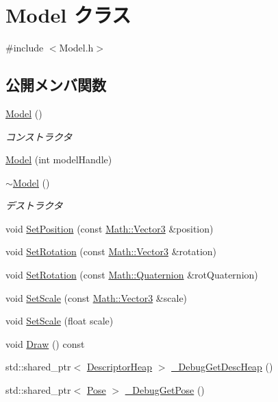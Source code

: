 \hypertarget{class_model}{}\section{Model クラス}
\label{class_model}


{\ttfamily \#include $<$Model.\+h$>$}

\subsection*{公開メンバ関数}
\begin{DoxyCompactItemize}
\item 
\mbox{\hyperlink{class_model_ae3b375de5f6df4faf74a95d64748e048}{Model}} ()
\begin{DoxyCompactList}\small\item\em コンストラクタ \end{DoxyCompactList}\item 
\mbox{\hyperlink{class_model_afce3f8d94c9a80c814df5546346f6efb}{Model}} (int model\+Handle)
\item 
\mbox{\hyperlink{class_model_ad6ebd2062a0b823db841a0b88baac4c0}{$\sim$\+Model}} ()
\begin{DoxyCompactList}\small\item\em デストラクタ \end{DoxyCompactList}\item 
void \mbox{\hyperlink{class_model_abe96911d27ec826d3267dce06998d11f}{Set\+Position}} (const \mbox{\hyperlink{struct_math_1_1_vector3}{Math\+::\+Vector3}} \&position)
\item 
void \mbox{\hyperlink{class_model_abaea345ca45636f8e4f557499e48cfdf}{Set\+Rotation}} (const \mbox{\hyperlink{struct_math_1_1_vector3}{Math\+::\+Vector3}} \&rotation)
\item 
void \mbox{\hyperlink{class_model_a512b73ff13cabdf1264d52a7a65b4481}{Set\+Rotation}} (const \mbox{\hyperlink{struct_math_1_1_quaternion}{Math\+::\+Quaternion}} \&rot\+Quaternion)
\item 
void \mbox{\hyperlink{class_model_aeffe10c8cb6db69220bb5f1b588935e4}{Set\+Scale}} (const \mbox{\hyperlink{struct_math_1_1_vector3}{Math\+::\+Vector3}} \&scale)
\item 
void \mbox{\hyperlink{class_model_a4c06da42f281939cfa54f9a955bc1321}{Set\+Scale}} (float scale)
\item 
void \mbox{\hyperlink{class_model_a1223b5f764ce02e3b3e6b80229cfb6f5}{Draw}} () const
\item 
std\+::shared\+\_\+ptr$<$ \mbox{\hyperlink{class_descriptor_heap}{Descriptor\+Heap}} $>$ \mbox{\hyperlink{class_model_a6f5a9f4a413ce2d4e03314ee95a86725}{\+\_\+\+Debug\+Get\+Desc\+Heap}} ()
\item 
std\+::shared\+\_\+ptr$<$ \mbox{\hyperlink{class_pose}{Pose}} $>$ \mbox{\hyperlink{class_model_ae348f27e9cb5cdee6e32029d4ef48300}{\+\_\+\+Debug\+Get\+Pose}} ()
\end{DoxyCompactItemize}
